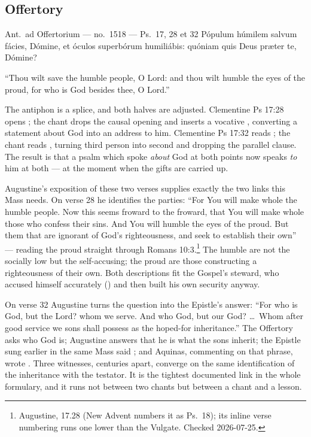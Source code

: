 \subsection{Offertory }

\begin{appointed}{Ant.\ ad Offertorium --- no.\ 1518 --- Ps.\ 17, 28 et 32}
Pópulum húmilem salvum fácies, Dómine, et óculos superbórum humiliábis:
quóniam quis Deus pr\ae ter te, Dómine?
\end{appointed}

\begin{englishwitness}
``Thou wilt save the humble people, O Lord: and thou wilt humble the eyes of the
proud, for who is God besides thee, O Lord.''
\end{englishwitness}

The antiphon is a splice, and both halves are adjusted. Clementine Ps 17:28
opens ; the chant drops the
causal opening and inserts a vocative , converting a statement
about God into an address to him. Clementine Ps 17:32 reads ; the chant reads
, turning third person into
second and dropping the parallel clause. The result is that a psalm which spoke
\emph{about} God at both points now speaks \emph{to} him at both --- at the
moment when the gifts are carried up.

Augustine's exposition of these two verses supplies exactly the two links this
Mass needs. On verse 28 he identifies the parties: ``For You will make whole the
humble people. Now this seems froward to the froward, that You will make whole
those who confess their sins. And You will humble the eyes of the proud. But
them that are ignorant of God's righteousness, and seek to establish their own''
--- reading the proud straight through Romans 10:3.\footnote{Augustine,
 17.28 (New Advent numbers it as Ps.\ 18); its inline verse
numbering runs one lower than the Vulgate. Checked 2026-07-25.} The humble are
not the socially low but the self-accusing; the proud are those constructing a
righteousness of their own. Both descriptions fit the Gospel's steward, who
accused himself accurately () and then built his own security
anyway.

On verse 32 Augustine turns the question into the Epistle's answer: ``For who is
God, but the Lord? whom we serve. And who God, but our God? \dots\ Whom after
good service we sons shall possess as the hoped-for inheritance.'' The Offertory
asks who God is; Augustine answers that he is what the sons inherit; the Epistle
sung earlier in the same Mass said ; and Aquinas,
commenting on that phrase, wrote . Three witnesses, centuries apart, converge on the same
identification of the inheritance with the testator. It is the tightest
documented link in the whole formulary, and it runs not between two chants but
between a chant and a lesson.

